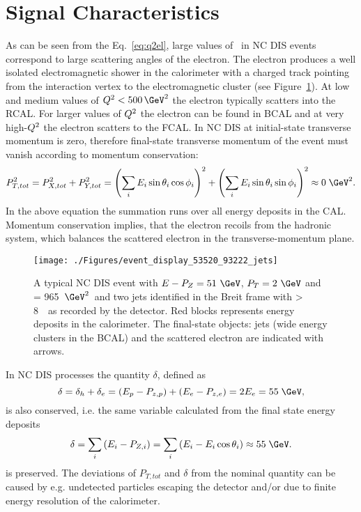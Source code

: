 \section{Signal Characteristics}
\label{sec:signalchar}
As can be seen from the Eq.~\eqref{eq:q2el}, large values of \qsq\, in NC DIS events correspond to large scattering angles of the electron. The electron produces a well isolated electromagnetic shower in the calorimeter with a charged track pointing from the interaction vertex to the electromagnetic cluster (see Figure~\ref{fig:ncdiseventdisplay}). At low and medium values of $\qsq < 500\, \GeV^2$ the electron typically scatters into the RCAL. For larger values of $\mbox{${Q^2}$}$ the electron can be found in BCAL and at very high-$\mbox{${Q^2}$}$ the electron scatters to the FCAL. In NC DIS at \hera initial-state transverse momentum is zero, therefore final-state transverse momentum of the event must vanish according to momentum conservation:
\begin{equation}
P_{T,tot}^2 = P_{X,tot}^2+P_{Y,tot}^2 = \left(\sum_i{E_i\sin{\theta_i}\cos{\phi_i}}\right)^2 + \left(\sum_i{E_i\sin{\theta_i}\sin{\phi_i}}\right)^2 \approx 0\;\GeV^2.
\end{equation}
 In the above equation the summation runs over all energy deposits in the CAL. Momentum conservation implies, that the electron recoils from the hadronic system, which balances the scattered electron in the transverse-momentum plane.
\begin{figure}[htbp]
	\centering
	\texttt{[image: ./Figures/event\_display\_53520\_93222\_jets]} 
	\caption{A typical NC DIS event with $E-P_Z=51~\GeV$, $P_T=2~\GeV$ and \qsq = 965~$\GeV^2$~and two jets identified in the Breit frame with \etjetb> 8~\GeV~as recorded by the \zeus detector. Red blocks represents energy deposits in the calorimeter. The final-state objects: jets (wide energy clusters in the BCAL) and the scattered electron are indicated with arrows.}
	\label{fig:ncdiseventdisplay}
\end{figure}

In NC DIS processes the quantity $\delta$, defined as
\begin{equation}
\delta = \delta_h + \delta_e = \left( E_p - P_{z,p} \right) + \left( E_e - P_{z,e}\right) = 2E_e = 55\;\GeV,
\label{eq:deltadis}
\end{equation}
is also conserved, i.e. the same variable calculated from the final state energy deposits
\begin{equation}
\delta = \sum_i{\left(E_i - P_{Z,i}\right)} = \sum_i{\left(E_i - E_i\cos{\theta_i}\right)} \approx 55\;\GeV.
\end{equation}
is preserved. The deviations of $P_{T,tot}$ and $\delta$ from the nominal quantity can be caused by e.g. undetected particles escaping the \zeus detector and/or due to finite energy resolution of the calorimeter.

